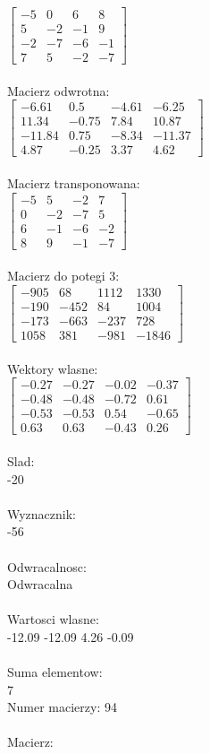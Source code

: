 \documentclass[a4paper,12pt]{article}
\begin{document}
$\begin{bmatrix} -5&0&6&8\\5&-2&-1&9\\-2&-7&-6&-1\\7&5&-2&-7 \end{bmatrix}$
\\
\\
Macierz odwrotna:\\

$\begin{bmatrix} -6.61&0.5&-4.61&-6.25\\11.34&-0.75&7.84&10.87\\-11.84&0.75&-8.34&-11.37\\4.87&-0.25&3.37&4.62 \end{bmatrix}$
\\
\\
Macierz transponowana:\\

$\begin{bmatrix} -5&5&-2&7\\0&-2&-7&5\\6&-1&-6&-2\\8&9&-1&-7 \end{bmatrix}$
\\
\\
Macierz do potegi 3:\\

$\begin{bmatrix} -905&68&1112&1330\\-190&-452&84&1004\\-173&-663&-237&728\\1058&381&-981&-1846 \end{bmatrix}$
\\
\\
Wektory wlasne:\\

$\begin{bmatrix} -0.27&-0.27&-0.02&-0.37\\-0.48&-0.48&-0.72&0.61\\-0.53&-0.53&0.54&-0.65\\0.63&0.63&-0.43&0.26 \end{bmatrix}$
\\
\\
Slad:\\
-20
\\
\\
Wyznacznik:\\
-56
\\
\\
Odwracalnosc:\\
Odwracalna
\\
\\
Wartosci wlasne:\\
-12.09 -12.09 4.26 -0.09
\\
\\
Suma elementow:\\
7
\\
\newpage
Numer macierzy:
94
\\
\\
Macierz:\\
\end{document}
